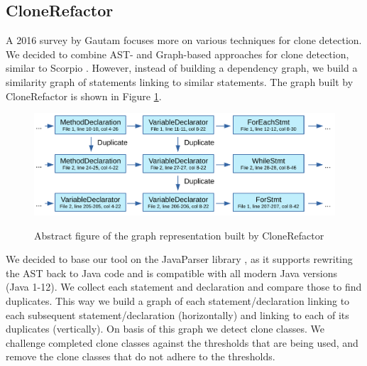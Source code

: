 \documentclass[a4paper]{article}
\begin{document}
\subsection{CloneRefactor}
A 2016 survey by Gautam \cite{gautam2016various} focuses more on various techniques for clone detection. We decided to combine AST- and Graph-based approaches for clone detection, similar to Scorpio \cite{higo2013revisiting, kamalpriya2017enhancing}. However, instead of building a dependency graph, we build a similarity graph of statements linking to similar statements. The graph built by CloneRefactor is shown in Figure \ref{fig:clonerefactor}.

\begin{figure}[H]
  \caption{Abstract figure of the graph representation built by CloneRefactor}
  \medskip
  \includegraphics[width=1\columnwidth]{img/CodeGraph}
  \label{fig:clonerefactor}
\end{figure}

We decided to base our tool on the JavaParser library \cite{tomassetti2017javaparser}, as it supports rewriting the AST back to Java code and is compatible with all modern Java versions (Java 1-12). We collect each statement and declaration and compare those to find duplicates. This way we build a graph of each statement/declaration linking to each subsequent statement/declaration (horizontally) and linking to each of its duplicates (vertically). On basis of this graph we detect clone classes. We challenge completed clone classes against the thresholds that are being used, and remove the clone classes that do not adhere to the thresholds.
\end{document}

